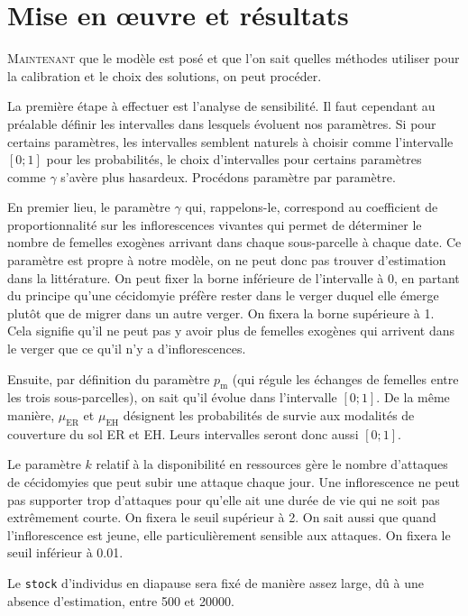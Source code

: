 \chapter{Mise en œuvre et résultats} 

\lettrine{M}{aintenant} que le modèle est posé et que l'on sait quelles méthodes utiliser pour la calibration et le choix des solutions, on peut procéder.

La première étape à effectuer est l'analyse de sensibilité.
Il faut cependant au préalable définir les intervalles dans lesquels évoluent nos paramètres.
Si pour certains paramètres, les intervalles semblent naturels à choisir comme l'intervalle $[0; 1]$ pour les probabilités, le choix d'intervalles pour certains paramètres comme $\gamma$ s'avère plus hasardeux.
Procédons paramètre par paramètre.

En premier lieu, le paramètre $\gamma$ qui, rappelons-le, correspond au coefficient de proportionnalité sur les inflorescences vivantes qui permet de déterminer le nombre de femelles exogènes arrivant dans chaque sous-parcelle à chaque date.
Ce paramètre est propre à notre modèle, on ne peut donc pas trouver d'estimation dans la littérature.
On peut fixer la borne inférieure de l'intervalle à 0, en partant du principe qu'une cécidomyie préfère rester dans le verger duquel elle émerge plutôt que de migrer dans un autre verger.
On fixera la borne supérieure à 1. Cela signifie qu'il ne peut pas y avoir plus de femelles exogènes qui arrivent dans le verger que ce qu'il n'y a d'inflorescences.

Ensuite, par définition du paramètre $p_{\text{m}}$ (qui régule les échanges de femelles entre les trois sous-parcelles), on sait qu'il évolue dans l'intervalle $[0;1]$.
De la même manière, $\mu_{\text{ER}}$ et $\mu_{\text{EH}}$ désignent les probabilités de survie aux modalités de couverture du sol ER et EH.
Leurs intervalles seront donc aussi $[0;1]$.

Le paramètre $k$ relatif à la disponibilité en ressources gère le nombre d'attaques de cécidomyies que peut subir une attaque chaque jour.
Une inflorescence ne peut pas supporter trop d'attaques pour qu'elle ait une durée de vie qui ne soit pas extrêmement courte. On fixera le seuil supérieur à 2.
On sait aussi que quand l'inflorescence est jeune, elle particulièrement sensible aux attaques.
On fixera le seuil inférieur à 0.01.

Le \texttt{stock} d'individus en diapause sera fixé de manière assez large, dû à une absence d'estimation, entre 500 et 20000.

